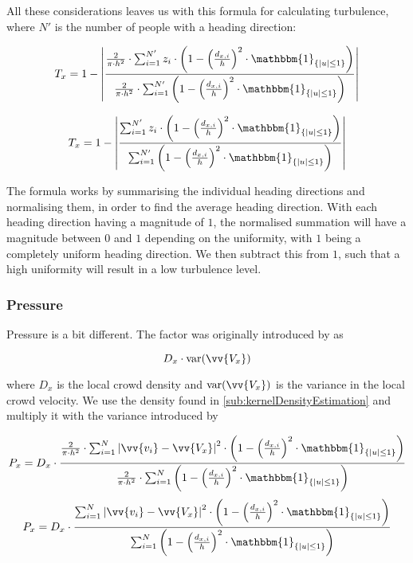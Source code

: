 All these considerations leaves us with this formula for calculating turbulence, where $N'$ is the number of people with a heading direction:

\begin{equation}
\label{eq:}
T_x = 1 - \left|\frac{\frac{2}{\pi \cdot h^2} \cdot \sum_{i=1}^{N'} z_i \cdot \left(1-\left(\frac{d_{x,i}}{h}\right)^2 \cdot \mathbbm{1}_{\{|u| \leq 1\} }\right)}{\frac{2}{\pi \cdot h^2} \cdot \sum_{i=1}^{N'} \left(1-\left(\frac{d_{x,i}}{h}\right)^2 \cdot \mathbbm{1}_{\{|u| \leq 1\} }\right)}\right|
\end{equation}

\begin{equation}
\label{eq:}
T_x = 1 - \left|\frac{\sum_{i=1}^{N'} z_i \cdot \left(1-\left(\frac{d_{x,i}}{h}\right)^2 \cdot \mathbbm{1}_{\{|u| \leq 1\} }\right)}{\sum_{i=1}^{N'} \left(1-\left(\frac{d_{x,i}}{h}\right)^2 \cdot \mathbbm{1}_{\{|u| \leq 1\} }\right)}\right|
\end{equation}

The formula works by summarising the individual heading directions and normalising them, in order to find the average heading direction. With each heading direction having a magnitude of $1$, the normalised summation will have a magnitude between $0$ and $1$ depending on the uniformity, with $1$ being a completely uniform heading direction. We then subtract this from $1$, such that a high uniformity will result in a low turbulence level.


\subsubsection{Pressure}
Pressure is a bit different. The factor was originally introduced by \citet{empircalstudy} as 

\begin{equation}
D_x \cdot \text{var}(\vv{V_x})
\end{equation}

where $D_x$ is the local crowd density and $\text{var}(\vv{V_x})$ is the variance in the local crowd velocity. We use the density found in \cref{sub:kernelDensityEstimation} and multiply it with the variance introduced by \citet{wirz2012inferring}

\begin{equation}
\label{eq:}
P_x = D_x \cdot \frac{\frac{2}{\pi \cdot h^2} \cdot \sum_{i=1}^{N} \left|\vv{v_i} - \vv{V_x}\right|^2 \cdot \left(1-\left(\frac{d_{x,i}}{h}\right)^2 \cdot \mathbbm{1}_{\{|u| \leq 1\} }\right)}{\frac{2}{\pi \cdot h^2} \cdot \sum_{i=1}^{N} \left(1-\left(\frac{d_{x,i}}{h}\right)^2 \cdot \mathbbm{1}_{\{|u| \leq 1\} }\right)}
\end{equation}
\begin{equation}
\label{eq:}
P_x = D_x \cdot \frac{\sum_{i=1}^{N} \left|\vv{v_i} - \vv{V_x}\right|^2 \cdot \left(1-\left(\frac{d_{x,i}}{h}\right)^2 \cdot \mathbbm{1}_{\{|u| \leq 1\} }\right)}{\sum_{i=1}^{N} \left(1-\left(\frac{d_{x,i}}{h}\right)^2 \cdot \mathbbm{1}_{\{|u| \leq 1\} }\right)}
\end{equation}

